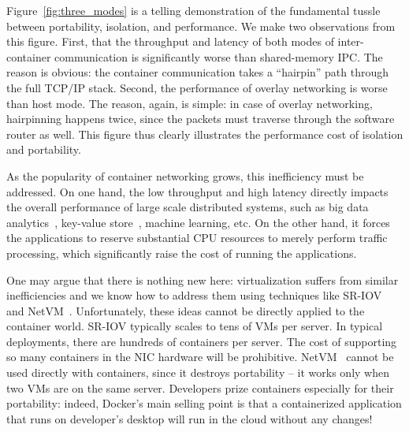 

Figure~\ref{fig:three_modes} is a telling demonstration of the fundamental
tussle between portability, isolation, and performance. We make two
observations from this figure. First, that the throughput and latency of both
modes of inter-container communication is significantly worse than
shared-memory IPC. The reason is obvious: the container communication takes a
``hairpin'' path through the full TCP/IP stack. Second, the performance of
overlay networking is worse than host mode. The reason, again, is simple: in
case of overlay networking, hairpinning happens twice, since the packets must
traverse through the software router as well. This figure thus clearly
illustrates the performance cost of isolation and portability.

As the popularity of container networking grows, this inefficiency must be
addressed. On one hand, the low throughput and high latency directly impacts
the overall performance of large scale distributed systems, such as big data
analytics~\cite{choudhury-paper,mapreduce}, key-value store~\cite{farm,cassandra,bigtable}, machine learning,
etc.  On the other hand, it forces the applications to reserve substantial CPU
resources to merely perform traffic processing, which significantly raise the
cost of running the applications.

One may argue that there is nothing new here: virtualization suffers from
similar inefficiencies and we know how to address them using techniques like
SR-IOV~\cite{sriov} and NetVM~\cite{netvm}. Unfortunately, these ideas cannot be directly applied to the container world.
SR-IOV typically scales to tens of VMs per server. In typical deployments, there
are hundreds of containers per server. The cost of supporting so many containers
in the NIC hardware will be prohibitive.  NetVM~\cite{netvm} cannot be used
directly with containers, since it destroys portability -- it works only when
two VMs are on the same server.  Developers prize containers especially for
their portability: indeed, Docker's main selling point is that a containerized
application that runs on developer's desktop will run in the cloud without any
changes! 


